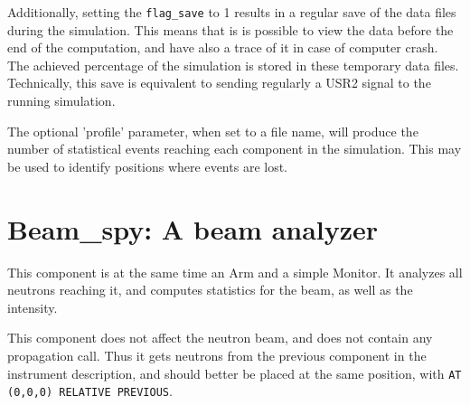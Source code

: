 Additionally, setting the \verb+flag_save+ to 1 results in
a regular save of the data files during the simulation.
This means that is is possible to view the data before the end
of the computation, and have also a trace of it in case of
computer crash. The achieved percentage of the simulation is stored in these temporary
data files. Technically, this save is equivalent to sending regularly
a USR2 signal to the running simulation.

The optional 'profile' parameter, when set to a file name, will produce the number of statistical events reaching each component in the simulation. This may be used to identify positions where events are lost.

\section{Beam\_spy: A beam analyzer}

This component is at the same time an Arm and a simple Monitor. It analyzes all neutrons reaching it, and computes statistics for the beam, as well as the intensity.

This component does not affect the neutron beam, and does not contain any propagation call. Thus it gets neutrons from the previous component in the instrument description, and should better be placed at the same position, with \verb+AT (0,0,0) RELATIVE PREVIOUS+.